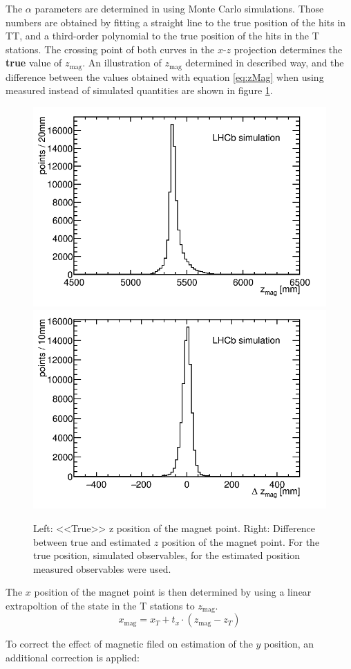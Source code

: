 The $\alpha$ parameters are determined in using Monte Carlo simulations. Those numbers are obtained by fitting a straight line to the true position of the hits in TT, and a third-order polynomial to the true
position of the hits in the T stations. The crossing point of both curves in the $x$-$z$ projection
determines the \textbf{true} value of $z_{\text{mag}}$. An illustration of $z_{\text{mag}}$ determined in described way, and
the difference between the values obtained with equation \ref{eq:zMag} when using measured 
instead of simulated quantities are shown in figure \ref{fig:zMag}.

\begin{figure}
 \begin{center}
   \includegraphics[width=0.49\linewidth]{figures/zMag.png}
    \includegraphics[width=0.49\linewidth]{figures/deltaZMag.png}
   \caption{Left: <<True>> z position of the magnet point. Right: Difference
   between true and estimated $z$ position of the magnet point. For the true position, simulated observables, for the estimated position measured observables were used.
     \label{fig:zMag}}
 \end{center}
\end{figure}

The $x$ position of the magnet point is then determined by using a linear extrapoltion of the
state in the T stations to $z_{\text{mag}}$.
\begin{equation}
x_{\text{mag}} = x_{T} + t_{x} \cdot (z_{\text{mag}} - z_{T})
\end{equation}

 
To correct the effect of magnetic filed on estimation of the $y$ position, an additional correction is applied:

